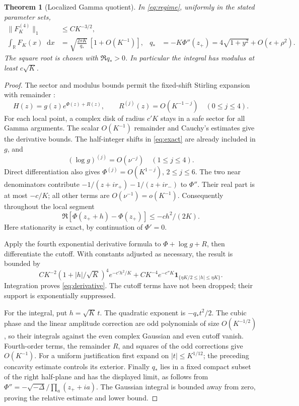 \documentclass[11pt,a4paper]{article}
\newtheorem{theorem}{Theorem}
\newcommand{\dd}{\mathop{}\!\mathrm d}
\begin{document}
\begin{theorem}[Localized Gamma quotient]
In \eqref{eq:regime}, uniformly in the stated parameter sets,
\begin{align}
 \|F_K^{(4)}\|_1&\le CK^{-3/2},\label{eq:derivative}\\
 \int_{\mathbb R}F_K(x)\dd x
 &=\sqrt{\frac{2\pi K}{q_*}}\,[1+O(K^{-1})],
 &q_*&=-K\Phi''(z_+)
   =4\sqrt{1+y^2}+O(\epsilon+\rho^2).
 \label{eq:gaussian}
\end{align}
The square root is chosen with \(\Re q_*>0\).
In particular the integral has modulus at least \(c\sqrt K\).
\end{theorem}

\begin{proof}
The sector and modulus bounds permit the fixed-shift Stirling
expansion with remainder \cite{DLMF}:
\[
 H(z)=g(z)e^{\Phi(z)+R(z)},\qquad
 R^{(j)}(z)=O(K^{-1-j})\quad(0\le j\le4).
\]
For each local point, a complex disk of radius \(c'K\) stays in
a safe sector for all Gamma arguments. The scalar \(O(K^{-1})\)
remainder and Cauchy's estimates give the derivative bounds.
The half-integer shifts in \eqref{eq:exact} are already included
in \(g\), and
\[
 (\log g)^{(j)}=O(\nu^{-j})\quad(1\le j\le4).
\]
Direct differentiation also gives
\(\Phi^{(j)}=O(K^{1-j})\), \(2\le j\le6\).
The two near denominators contribute
\(-1/(z+ir_+)-1/(z+ir_-)\) to \(\Phi''\).
Their real part is at most \(-c/K\);
all other terms are \(O(\nu^{-1})=o(K^{-1})\).
Consequently throughout the local segment
\[
 \Re[\Phi(z_++h)-\Phi(z_+)]\le -ch^2/(2K).
\]
Here stationarity is exact, by continuation of \(\Phi'=0\).

Apply the fourth exponential derivative formula to
\(\Phi+\log g+R\), then differentiate the cutoff.
With constants adjusted as necessary, the result is bounded by
\[
 CK^{-2}(1+|h|/\sqrt K)^4e^{-c'h^2/K}
 +CK^{-4}e^{-c''K}
   \mathbf1_{\{\eta K/2\le|h|\le\eta K\}} .
\]
Integration proves \eqref{eq:derivative}.
The cutoff terms have not been dropped; their support is
exponentially suppressed.

For the integral, put \(h=\sqrt K\,t\).
The quadratic exponent is \(-q_*t^2/2\).
The cubic phase and the linear amplitude correction are odd
polynomials of size \(O(K^{-1/2})\), so their integrals against
the even complex Gaussian and even cutoff vanish.
Fourth-order terms, the remainder \(R\), and squares of the odd
corrections give \(O(K^{-1})\).
For a uniform justification first expand on \(|t|\le K^{1/12}\);
the preceding concavity estimate controls its exterior.
Finally \(q_*\) lies in a fixed compact subset of the right
half-plane and has the displayed limit, as follows from
\(\Phi''=-\sqrt{-\Delta}/\prod_a(z_++ia)\).
The Gaussian integral is bounded away from zero, proving the
relative estimate and lower bound.
\end{proof}
\end{document}
